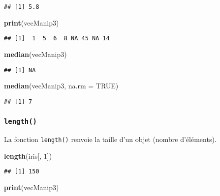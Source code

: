\documentclass[]{book}
\newenvironment{Shaded}{\begin{snugshade}}{\end{snugshade}}
\newcommand{\KeywordTok}[1]{\textcolor[rgb]{0.13,0.29,0.53}{\textbf{#1}}}
\newcommand{\DataTypeTok}[1]{\textcolor[rgb]{0.13,0.29,0.53}{#1}}
\newcommand{\DecValTok}[1]{\textcolor[rgb]{0.00,0.00,0.81}{#1}}
\newcommand{\OtherTok}[1]{\textcolor[rgb]{0.56,0.35,0.01}{#1}}
\newcommand{\NormalTok}[1]{#1}
\theoremstyle{definition}
\theoremstyle{definition}
\theoremstyle{definition}
\theoremstyle{remark}
\begin{document}
\begin{verbatim}
## [1] 5.8
\end{verbatim}

\begin{Shaded}
\begin{Highlighting}[]
\KeywordTok{print}\NormalTok{(vecManip3)}
\end{Highlighting}
\end{Shaded}

\begin{verbatim}
## [1]  1  5  6  8 NA 45 NA 14
\end{verbatim}

\begin{Shaded}
\begin{Highlighting}[]
\KeywordTok{median}\NormalTok{(vecManip3)}
\end{Highlighting}
\end{Shaded}

\begin{verbatim}
## [1] NA
\end{verbatim}

\begin{Shaded}
\begin{Highlighting}[]
\KeywordTok{median}\NormalTok{(vecManip3, }\DataTypeTok{na.rm =} \OtherTok{TRUE}\NormalTok{)}
\end{Highlighting}
\end{Shaded}

\begin{verbatim}
## [1] 7
\end{verbatim}

\hypertarget{l015length}{\subsubsection{\texorpdfstring{\texttt{length()}}{length()}}\label{l015length}}

La fonction \texttt{length()} renvoie la taille d'un objet (nombre
d'éléments).

\begin{Shaded}
\begin{Highlighting}[]
\KeywordTok{length}\NormalTok{(iris[, }\DecValTok{1}\NormalTok{])}
\end{Highlighting}
\end{Shaded}

\begin{verbatim}
## [1] 150
\end{verbatim}

\begin{Shaded}
\begin{Highlighting}[]
\KeywordTok{print}\NormalTok{(vecManip3)}
\end{Highlighting}
\end{Shaded}
\end{document}
